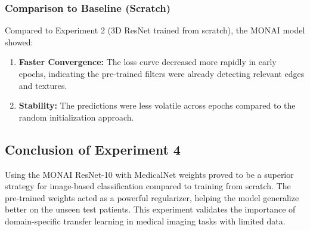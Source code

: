 \subsubsection{Comparison to Baseline (Scratch)}
Compared to Experiment 2 (3D ResNet trained from scratch), the MONAI model showed:
\begin{enumerate}
    \item \textbf{Faster Convergence:} The loss curve decreased more rapidly in early epochs, indicating the pre-trained filters were already detecting relevant edges and textures.
    \item \textbf{Stability:} The predictions were less volatile across epochs compared to the random initialization approach.
\end{enumerate}

\subsection{Conclusion of Experiment 4}
Using the MONAI ResNet-10 with MedicalNet weights proved to be a superior strategy for image-based classification compared to training from scratch. The pre-trained weights acted as a powerful regularizer, helping the model generalize better on the unseen test patients. This experiment validates the importance of domain-specific transfer learning in medical imaging tasks with limited data.